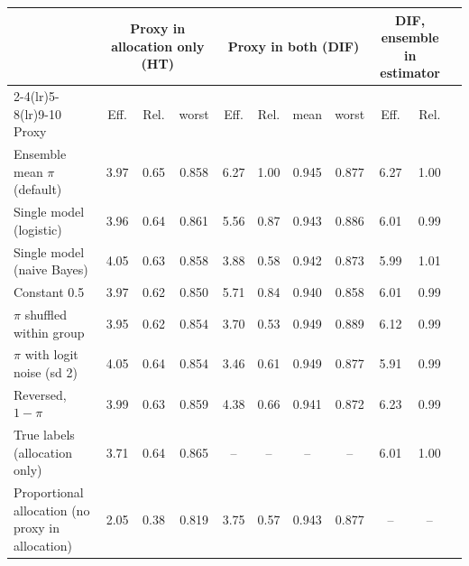 \begin{tabular}{lcccccccccc}
\toprule
 & \multicolumn{3}{c}{Proxy in allocation only (HT)} & \multicolumn{4}{c}{Proxy in both (DIF)} & \multicolumn{2}{c}{DIF, ensemble in estimator} \\
\cmidrule(lr){2-4}\cmidrule(lr){5-8}\cmidrule(lr){9-10}
Proxy & Eff. & Rel. & worst & Eff. & Rel. & mean & worst & Eff. & Rel. \\
\midrule
Ensemble mean $\pi$ (default) & 3.97 & 0.65 & 0.858 & 6.27 & 1.00 & 0.945 & 0.877 & 6.27 & 1.00 \\
Single model (logistic) & 3.96 & 0.64 & 0.861 & 5.56 & 0.87 & 0.943 & 0.886 & 6.01 & 0.99 \\
Single model (naive Bayes) & 4.05 & 0.63 & 0.858 & 3.88 & 0.58 & 0.942 & 0.873 & 5.99 & 1.01 \\
Constant 0.5 & 3.97 & 0.62 & 0.850 & 5.71 & 0.84 & 0.940 & 0.858 & 6.01 & 0.99 \\
$\pi$ shuffled within group & 3.95 & 0.62 & 0.854 & 3.70 & 0.53 & 0.949 & 0.889 & 6.12 & 0.99 \\
$\pi$ with logit noise (sd 2) & 4.05 & 0.64 & 0.854 & 3.46 & 0.61 & 0.949 & 0.877 & 5.91 & 0.99 \\
Reversed, $1-\pi$ & 3.99 & 0.63 & 0.859 & 4.38 & 0.66 & 0.941 & 0.872 & 6.23 & 0.99 \\
True labels (allocation only) & 3.71 & 0.64 & 0.865 & -- & -- & -- & -- & 6.01 & 1.00 \\
\addlinespace
Proportional allocation (no proxy in allocation) & 2.05 & 0.38 & 0.819 & 3.75 & 0.57 & 0.943 & 0.877 & -- & -- \\
\bottomrule
\end{tabular}
